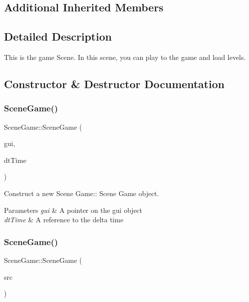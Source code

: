 \subsection*{Additional Inherited Members}


\subsection{Detailed Description}
This is the game Scene. In this scene, you can play to the game and load levels. 

\subsection{Constructor \& Destructor Documentation}
\mbox{\label{class_scene_game_a1657843625d6983e5eb49e7509f88108}} 
\subsubsection{\texorpdfstring{Scene\+Game()}{SceneGame()}\hspace{0.1cm}{\footnotesize\ttfamily [1/2]}}
{\footnotesize\ttfamily Scene\+Game\+::\+Scene\+Game (\begin{DoxyParamCaption}\item[{\hyperlink{class_gui}{Gui} $\ast$}]{gui,  }\item[{float const \&}]{dt\+Time }\end{DoxyParamCaption})}



Construct a new Scene Game\+:\+: Scene Game object. 


\begin{DoxyParams}{Parameters}
{\em gui} & A pointer on the gui object \\
\hline
{\em dt\+Time} & A reference to the delta time \\
\hline
\end{DoxyParams}
\mbox{\label{class_scene_game_a0fcd21aad79ec54227df066acd260386}} 
\subsubsection{\texorpdfstring{Scene\+Game()}{SceneGame()}\hspace{0.1cm}{\footnotesize\ttfamily [2/2]}}
{\footnotesize\ttfamily Scene\+Game\+::\+Scene\+Game (\begin{DoxyParamCaption}\item[{\hyperlink{class_scene_game}{Scene\+Game} const \&}]{src }\end{DoxyParamCaption})}



